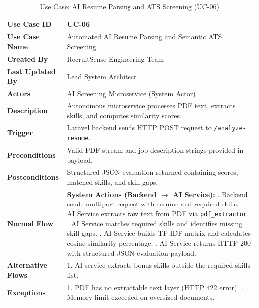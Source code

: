 \begin{table}[h!]
\centering
\small
\caption{Use Case: AI Resume Parsing and ATS Screening (UC-06)}
\label{tab:uc06_spec}
\begin{tabular}{|p{3.5cm}|p{11.5cm}|}
\hline
\textbf{Use Case ID} & UC-06 \\ \hline
\textbf{Use Case Name} & Automated AI Resume Parsing and Semantic ATS Screening \\ \hline
\textbf{Created By} & RecruitSense Engineering Team \\ \hline
\textbf{Last Updated By} & Lead System Architect \\ \hline
\textbf{Actors} & AI Screening Microservice (System Actor) \\ \hline
\textbf{Description} & Autonomous microservice processes PDF text, extracts skills, and computes similarity scores. \\ \hline
\textbf{Trigger} & Laravel backend sends HTTP POST request to \texttt{/analyze-resume}. \\ \hline
\textbf{Preconditions} & Valid PDF stream and job description strings provided in payload. \\ \hline
\textbf{Postconditions} & Structured JSON evaluation returned containing scores, matched skills, and skill gaps. \\ \hline
\textbf{Normal Flow} & 
\textbf{System Actions (Backend $\rightarrow$ AI Service):} \newline
1. Backend sends multipart request with resume and required skills. \newline
2. AI Service extracts raw text from PDF via \texttt{pdf\_extractor}. \newline
3. AI Service matches required skills and identifies missing skill gaps. \newline
4. AI Service builds TF-IDF matrix and calculates cosine similarity percentage. \newline
5. AI Service returns HTTP 200 with structured JSON evaluation payload. \\ \hline
\textbf{Alternative Flows} & 1. AI service extracts bonus skills outside the required skills list. \\ \hline
\textbf{Exceptions} & 1. PDF has no extractable text layer (HTTP 422 error). \newline 2. Memory limit exceeded on oversized documents. \\ \hline
\end{tabular}
\end{table}

